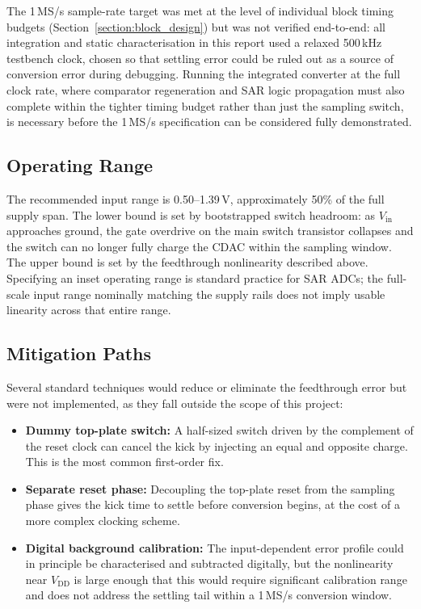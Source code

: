 \documentclass[12pt, a4paper]{article}
\begin{document}
The 1\,MS/s sample-rate target was met at the level of individual block timing budgets (Section~\ref{section:block_design}) but was not verified end-to-end: all integration and static characterisation in this report used a relaxed 500\,kHz testbench clock, chosen so that settling error could be ruled out as a source of conversion error during debugging. Running the integrated converter at the full clock rate, where comparator regeneration and SAR logic propagation must also complete within the tighter timing budget rather than just the sampling switch, is necessary before the 1\,MS/s specification can be considered fully demonstrated.

\subsection{Operating Range}

The recommended input range is 0.50--1.39\,V, approximately 50\% of the full supply span. The lower bound is set by bootstrapped switch headroom: as $V_\mathrm{in}$ approaches ground, the gate overdrive on the main switch transistor collapses and the switch can no longer fully charge the CDAC within the sampling window. The upper bound is set by the feedthrough nonlinearity described above. Specifying an inset operating range is standard practice for SAR ADCs; the full-scale input range nominally matching the supply rails does not imply usable linearity across that entire range.

\subsection{Mitigation Paths}
\label{subsection:mitigation}

Several standard techniques would reduce or eliminate the feedthrough error but were not implemented, as they fall outside the scope of this project:

\begin{itemize}
    \item \textbf{Dummy top-plate switch:} A half-sized switch driven by the complement of the reset clock can cancel the kick by injecting an equal and opposite charge. This is the most common first-order fix.
    \item \textbf{Separate reset phase:} Decoupling the top-plate reset from the sampling phase gives the kick time to settle before conversion begins, at the cost of a more complex clocking scheme.
    \item \textbf{Digital background calibration:} The input-dependent error profile could in principle be characterised and subtracted digitally, but the nonlinearity near $V_\mathrm{DD}$ is large enough that this would require significant calibration range and does not address the settling tail within a 1\,MS/s conversion window.
\end{itemize}
\end{document}

